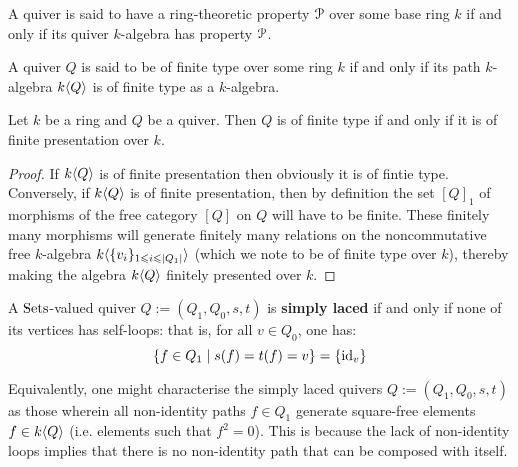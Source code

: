             \begin{definition}
                A quiver is said to have a ring-theoretic property $\mathcal{P}$ over some base ring $k$ if and only if its quiver $k$-algebra has property $\mathcal{P}$.
            \end{definition}
            \begin{example} \label{example: quivers_of_finite_type}
                A quiver $Q$ is said to be of finite type over some ring $k$ if and only if its path $k$-algebra $k\langle Q\rangle$ is of finite type as a $k$-algebra.
            \end{example}
            \begin{proposition} \label{prop: quivers_of_finite_type_are_of_finite_presentations}
                Let $k$ be a ring and $Q$ be a quiver. Then $Q$ is of finite type if and only if it is of finite presentation over $k$.
            \end{proposition}
                \begin{proof}
                    If $k\langle Q\rangle$ is of finite presentation then obviously it is of fintie type. Conversely, if $k\langle Q\rangle$ is of finite presentation, then by definition the set $[Q]_1$ of morphisms of the free category $[Q]$ on $Q$ will have to be finite. These finitely many morphisms will generate finitely many relations on the noncommutative free $k$-algebra $k\langle\{v_i\}_{1 \leqslant i \leqslant |Q_1|}\rangle$ (which we note to be of finite type over $k$), thereby making the algebra $k\langle Q\rangle$ finitely presented over $k$.
                \end{proof}
            \begin{definition} \label{def: simply_laced_quivers}
                A $\mathrm{Sets}$-valued quiver $Q := (Q_1, Q_0, s, t)$ is \textbf{simply laced} if and only if none of its vertices has self-loops: that is, for all $v \in Q_0$, one has:
                    $$\{f \in Q_1 \mid s(f) = t(f) = v\} = \{\mathrm{id}_v\}$$
            \end{definition}
            \begin{remark}
                Equivalently, one might characterise the simply laced quivers $Q := (Q_1, Q_0, s, t)$ as those wherein all non-identity paths $f \in Q_1$ generate square-free elements $f \in k\langle Q\rangle$ (i.e. elements such that $f^2 = 0$). This is because the lack of non-identity loops implies that there is no non-identity path that can be composed with itself. 
            \end{remark}
